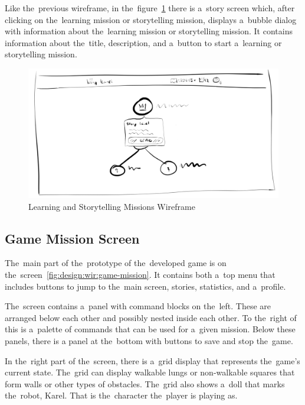 Like the~previous wireframe, in the~figure~\ref{fig:design:wir:story-learning} there is a~story screen which, after clicking on the~learning mission or storytelling mission, displays a~bubble dialog with information about the~learning mission or storytelling mission.
It contains information about the~title, description, and a~button to start a~learning or storytelling mission.

\begin{figure}
    \centering
    \includegraphics[width=1\linewidth]{assets/design/ui/wir_story.png}
    \caption{Learning and Storytelling Missions Wireframe}
    \label{fig:design:wir:story-learning}
\end{figure}

\subsection{Game Mission Screen}

The~main part of the~prototype of the~developed game is on the~screen~\ref{fig:design:wir:game-mission}.
It contains both a~top menu that includes buttons to jump to the~main screen, stories, statistics, and a~profile.

The~screen contains a~panel with command blocks on the~left.
These are arranged below each other and possibly nested inside each other.
To the~right of this is a~palette of commands that can be used for a~given mission.
Below these panels, there is a panel at the~bottom with buttons to save and stop the~game.

In the~right part of the~screen, there is a~grid display that represents the~game's current state.
The~grid can display walkable lungs or non-walkable squares that form walls or other types of obstacles.
The~grid also shows a~doll that marks the~robot, Karel.
That is the~character the~player is playing as.

